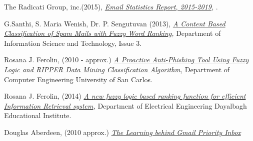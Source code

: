 \documentclass[journal]{IEEEtran}
\begin{document}
\begin{thebibliography}{9}
    The Radicati Group, inc.(2015),
    \textit{
        \href{https://github.com/Menziess/Fuzzy-Logic-Email-Classification/raw/master/report/res/a_new_fuzzy_logic_based_ranking_function_for_efficient_information_retrieval_system.pdf}{Email Statistics Report, 2015-2019},
    }.

    G.Santhi, S. Maria Wenish, Dr. P. Sengutuvan (2013),
    \textit{
        \href{https://github.com/Menziess/Fuzzy-Logic-Email-Classification/raw/master/report/res/a_content_based_classification_of_spam_mails_with_fuzzy_word_ranking.pdf}{A Content Based Classification of Spam Mails with Fuzzy Word Ranking},
    }
    Department of Information Science and Technology,
    Issue 3.

    Rosana J. Ferolin, (2010 - approx.)
    \textit{
        \href{https://github.com/Menziess/Fuzzy-Logic-Email-Classification/raw/master/report/res/a_proactive_anti-phishing_tool_using_fuzzy_logic_and_ripper_data_mining_classification_algorithm.pdf}{A Proactive Anti-Phishing Tool Using Fuzzy Logic and RIPPER Data Mining Classification Algorithm},
    }
    Department of Computer Engineering University of San Carlos.

    Rosana J. Ferolin, (2014)
    \textit{
        \href{https://github.com/Menziess/Fuzzy-Logic-Email-Classification/raw/master/report/res/a_new_fuzzy_logic_based_ranking_function_for_efficient_information_retrieval_system.pdf}{A new fuzzy logic based ranking function for efficient Information Retrieval system},
    }
    Department of Electrical Engineering Dayalbagh Educational Institute.

    Douglas Aberdeen, (2010 approx.)
    \textit{
        \href{[nog toevoegen}{The Learning behind Gmail Priority Inbox}
    }

\end{thebibliography}
\end{document}
